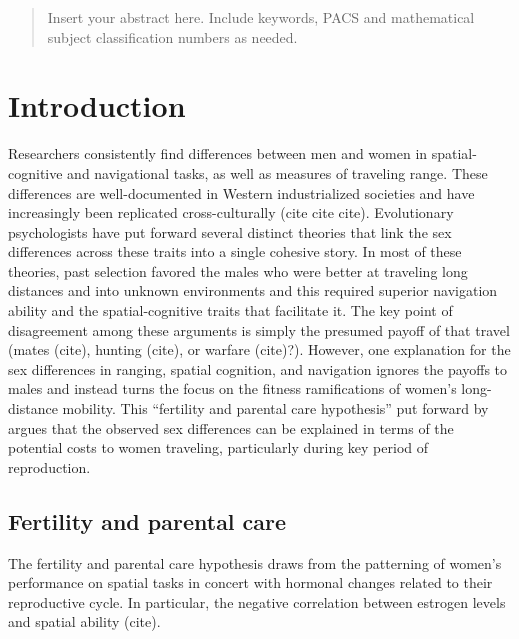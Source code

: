 \date{Received: date / Accepted: date}


\maketitle

\begin{abstract}
Insert your abstract here. Include keywords, PACS and mathematical
subject classification numbers as needed.
\end{abstract}

\section{Introduction}
\label{sec:1}
Researchers consistently find differences between men and women in spatial-cognitive and navigational tasks, as well as measures of traveling range.  These differences are well-documented in Western industrialized societies and have increasingly been replicated cross-culturally (cite cite cite).  Evolutionary psychologists have put forward several distinct theories that link the sex differences across these traits into a single cohesive story.  In most of these theories, past selection favored the males who were better at traveling long distances and into unknown environments and this required superior navigation ability and the spatial-cognitive traits that facilitate it.  The key point of disagreement among these arguments is simply the presumed payoff of that travel (mates (cite), hunting (cite), or warfare (cite)?).  However, one explanation for the sex differences in ranging, spatial cognition, and navigation ignores the payoffs to males and instead turns the focus on the fitness ramifications of women's long-distance mobility.  This ``fertility and parental care hypothesis'' put forward by \cite{sherry1997evolution} argues that the observed sex differences can be explained in terms of the potential costs to women traveling, particularly during key period of reproduction.

	\subsection{Fertility and parental care}
	\label{sec:1.1}
The fertility and parental care hypothesis draws from the patterning of women's performance on spatial tasks in concert with hormonal changes related to their reproductive cycle.  In particular, the negative correlation between estrogen levels and spatial ability (cite).  
	
